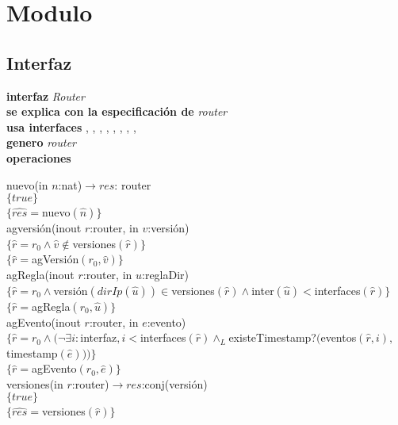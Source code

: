 \section{Modulo }

\vspace{22pt}

\subsection*{Interfaz}
\hspace{-0.75cm}
\textbf{interfaz} \textit{Router}\\
\textbf{se explica con la especificaci\'on de} \textit{router}\\
\textbf{usa interfaces} , , ,  ,  , , , , \\
\textbf{genero} \textit{router}\\
\textbf{operaciones}

nuevo(in $n$:nat)$\rightarrow res$: router\\
$\{true\}$\\
$\{\widehat{res}=$nuevo$(\widehat{n})\}$\\

agversi\'on(inout $r$:router, in $v$:versi\'on)\\
$\{\widehat{r}= r_0 \wedge \widehat{v} \notin $versiones$(\widehat{r})\}$\\
$\{\widehat{r}=$agVersi\'on$(r_0,\widehat{v})\}$\\

agRegla(inout $r$:router, in $u$:reglaDir)\\
$\{\widehat{r}=r_0 \wedge $versi\'on$(dirIp(\widehat{u}))\in $versiones$(\widehat{r}) \wedge $inter$(\widehat{u}) < $interfaces$(\widehat{r})\}$\\
$\{\widehat{r}=$agRegla$(r_0,\widehat{u})\}$\\

agEvento(inout $r$:router, in $e$:evento)\\
$\{\widehat{r}=r_0 \wedge (\neg \exists i: $interfaz$, i < $interfaces$(\widehat{r}) \wedge_L $existeTimestamp?$($eventos$(\widehat{r},i),$timestamp$(\widehat{e})))\}$\\
$\{\widehat{r}=$agEvento$(r_0,\widehat{e})\}$\\

versiones(in $r$:router)$\longrightarrow res$:conj(versi\'on)\\
$\{true\}$\\
$\{\widehat{res}=$versiones$(\widehat{r})\}$\\

